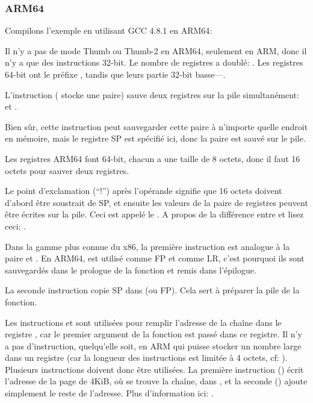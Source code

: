 ﻿\subsubsection{ARM64}


Compilons l'exemple en utilisant GCC 4.8.1 en ARM64:



Il n'y a pas de mode Thumb ou Thumb-2 en ARM64, seulement en ARM, donc il n'y a que des
instructions 32-bit.
Le nombre de registres a doublé: .
Les registres 64-bit ont le préfixe , tandis que leurs partie 32-bit basse---.

L'instruction  ( stocke une paire)
sauve deux registres sur la pile simultanément:  et .

Bien sûr, cette instruction peut sauvegarder cette paire à n'importe quelle endroit en mémoire,
mais le registre \ac{SP} est spécifié ici, donc la paire est sauvé sur le pile.

Les registres ARM64 font 64-bit, chacun a une taille de 8 octets, donc il faut 16 octets pour sauver
deux registres.

Le point d'exclamation (``!'') après l'opérande signifie que 16 octets doivent d'abord être soustrait de \ac{SP},
et ensuite les valeurs de la paire de registres peuvent être écrites sur la pile.
Ceci est appelé le .
A propos de la différence entre  et 
lisez ceci: .

Dans la gamme plus connue du x86, la première instruction est analogue à la paire
 et .
En ARM64,  est utilisé comme \ac{FP} et  comme \ac{LR}, c'est pourquoi ils sont
sauvegardés dans le prologue de la fonction et remis dans l'épilogue.

La seconde instruction copie \ac{SP} dans  (ou \ac{FP}).
Cela sert à préparer la pile de la fonction.

\label{pointers_ADRP_and_ADD}
Les instructions  et \ADD sont utilisées pour remplir l'adresse de
la chaîne  dans le registre ,
car le premier argument de la fonction est passé dans ce registre.
Il n'y a pas d'instruction, quelqu'elle soit, en ARM qui puisse stocker un nombre large
dans un registre (car la longueur des instructions est limitée à 4 octets, cf: ).
Plusieurs instructions doivent donc être utilisées. La première instruction () écrit l'adresse de
la page de 4KiB, où se trouve la chaîne, dans , et la seconde (\ADD) ajoute simplement
le reste de l'adresse.
Plus d'information ici: .

